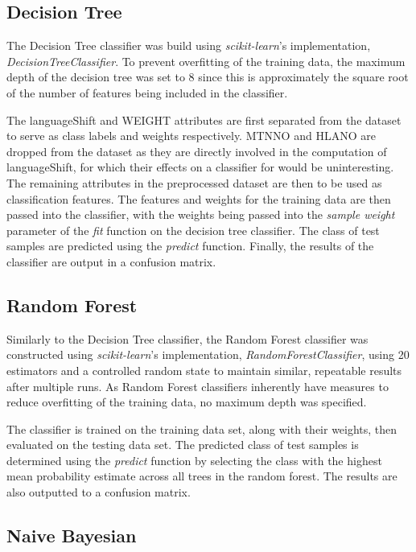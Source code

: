 \documentclass[10pt, conference, compsocconf]{IEEEtran}
\begin{document}
\subsection{Decision Tree}
The Decision Tree classifier was build using \textit{scikit-learn}'s implementation, \textit{DecisionTreeClassifier}. To prevent overfitting of the training data, the maximum depth of the decision tree was set to 8 since this is approximately the square root of the number of features being included in the classifier.

The languageShift and WEIGHT attributes are first separated from the dataset to serve as class labels and weights respectively.  MTNNO and HLANO are dropped from the dataset as they are directly involved in the computation of languageShift, for which their effects on a classifier for would be uninteresting.  The remaining attributes in the preprocessed dataset are then to be used as classification features. The features and weights for the training data are then passed into the classifier, with the weights being passed into the \textit{sample weight} parameter of the \textit{fit} function on the decision tree classifier. The class of test samples are predicted using the \textit{predict} function. Finally, the results of the classifier are output in a confusion matrix.

\subsection{Random Forest}

Similarly to the Decision Tree classifier, the Random Forest classifier was constructed using \textit{scikit-learn}'s implementation, \textit{RandomForestClassifier}, using 20 estimators and a controlled random state to maintain similar, repeatable results after multiple runs. As Random Forest classifiers inherently have measures to reduce overfitting of the training data, no maximum depth was specified.

The classifier is trained on the training data set, along with their weights, then evaluated on the testing data set. The predicted class of test samples is determined using the \textit{predict} function by selecting the class with the highest mean probability estimate across all trees in the random forest. The results are also outputted to a confusion matrix.

\subsection{Naive Bayesian}
\end{document}
